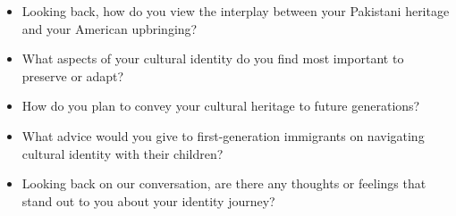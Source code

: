 \begin{itemize}
    \item Looking back, how do you view the interplay between your Pakistani heritage and your American upbringing?
    \item What aspects of your cultural identity do you find most important to preserve or adapt?
    \item How do you plan to convey your cultural heritage to future generations?
    \item What advice would you give to first-generation immigrants on navigating cultural identity with their children?
    \item Looking back on our conversation, are there any thoughts or feelings that stand out to you about your identity journey?

\end{itemize}